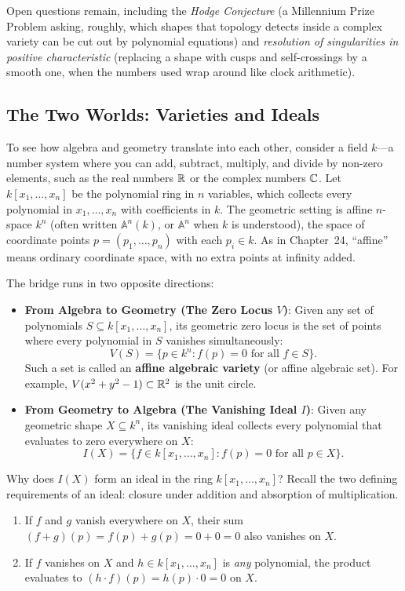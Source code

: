 \begin{historybox}
Open questions remain, including the \emph{Hodge Conjecture} (a Millennium Prize Problem asking, roughly, which shapes that topology detects inside a complex variety can be cut out by polynomial equations) and \emph{resolution of singularities in positive characteristic} (replacing a shape with cusps and self-crossings by a smooth one, when the numbers used wrap around like clock arithmetic).
\end{historybox}

\subsection{The Two Worlds: Varieties and Ideals}

To see how algebra and geometry translate into each other, consider a field $k$---a number system where you can add, subtract, multiply, and divide by non-zero elements, such as the real numbers $\mathbb{R}$ or the complex numbers $\mathbb{C}$. Let $k[x_1, \dots, x_n]$ be the polynomial ring in $n$ variables, which collects every polynomial in $x_1, \dots, x_n$ with coefficients in $k$. The geometric setting is affine $n$-space $k^n$ (often written $\mathbb{A}^n(k)$, or $\mathbb{A}^n$ when $k$ is understood), the space of coordinate points $p = (p_1, \dots, p_n)$ with each $p_i \in k$. As in Chapter~24, ``affine'' means ordinary coordinate space, with no extra points at infinity added.

The bridge runs in two opposite directions:

\begin{itemize}
  \item \textbf{From Algebra to Geometry (The Zero Locus $V$)}: Given any set of polynomials $S \subseteq k[x_1, \dots, x_n]$, its geometric zero locus is the set of points where every polynomial in $S$ vanishes simultaneously:
  \[
  V(S) = \{p \in k^n : f(p) = 0 \text{ for all } f \in S\}.
  \]
  Such a set is called an \textbf{affine algebraic variety} (or affine algebraic set). For example, $V(x^2 + y^2 - 1) \subset \mathbb{R}^2$ is the unit circle.
  \item \textbf{From Geometry to Algebra (The Vanishing Ideal $I$)}: Given any geometric shape $X \subseteq k^n$, its vanishing ideal collects every polynomial that evaluates to zero everywhere on $X$:
  \[
  I(X) = \{f \in k[x_1, \dots, x_n] : f(p) = 0 \text{ for all } p \in X\}.
  \]
\end{itemize}

Why does $I(X)$ form an ideal in the ring $k[x_1, \dots, x_n]$? Recall the two defining requirements of an ideal: closure under addition and absorption of multiplication.
\begin{enumerate}
  \item If $f$ and $g$ vanish everywhere on $X$, their sum $(f+g)(p) = f(p) + g(p) = 0 + 0 = 0$ also vanishes on $X$.
  \item If $f$ vanishes on $X$ and $h \in k[x_1, \dots, x_n]$ is \emph{any} polynomial, the product evaluates to $(h \cdot f)(p) = h(p) \cdot 0 = 0$ on $X$.
\end{enumerate}

